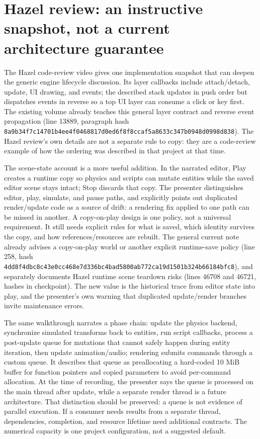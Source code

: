 \section{Hazel review: an instructive snapshot, not a current architecture guarantee}\label{06-engine-ii-ch046-hazel-review-an-instructive-snapshot-not-a-current-architecture-guarantee}

The Hazel code-review video gives one implementation snapshot that can deepen the generic engine lifecycle discussion. Its layer callbacks include attach/detach, update, UI drawing, and events; the described stack updates in push order but dispatches events in reverse so a top UI layer can consume a click or key first. The existing volume already teaches this general layer contract and reverse event propagation (line 13889, paragraph hash \texttt{8a9b34f7c14701b4ee4f0468817d0ed6f8f8ccaf5a8633c347b0948d0998d838}). The Hazel review's own details are not a separate rule to copy: they are a code-review example of how the ordering was described in that project at that time.

The scene-state account is a more useful addition. In the narrated editor, Play creates a runtime copy so physics and scripts can mutate entities while the saved editor scene stays intact; Stop discards that copy. The presenter distinguishes editor, play, simulate, and pause paths, and explicitly points out duplicated render/update code as a source of drift: a rendering fix applied to one path can be missed in another. A copy-on-play design is one policy, not a universal requirement. It still needs explicit rules for what is saved, which identity survives the copy, and how references/resources are rebuilt. The general current note already advises a copy-on-play world or another explicit runtime-save policy (line 258, hash \texttt{4dd8f4dbc8c43e0cc468e7d336bc4bad5800ab772ca19d1501b324b66184bfc8}), and separately documents Hazel runtime scene teardown risks (lines 46708 and 46721, hashes in checkpoint). The new value is the historical trace from editor state into play, and the presenter's own warning that duplicated update/render branches invite maintenance errors.

The same walkthrough narrates a phase chain: update the physics backend, synchronize simulated transforms back to entities, run script callbacks, process a post-update queue for mutations that cannot safely happen during entity iteration, then update animation/audio; rendering submits commands through a custom queue. It describes that queue as preallocating a hard-coded 10 MiB buffer for function pointers and copied parameters to avoid per-command allocation. At the time of recording, the presenter says the queue is processed on the main thread after update, while a separate render thread is a future architecture. That distinction should be preserved: a queue is not evidence of parallel execution. If a consumer needs results from a separate thread, dependencies, completion, and resource lifetime need additional contracts. The numerical capacity is one project configuration, not a suggested default.

